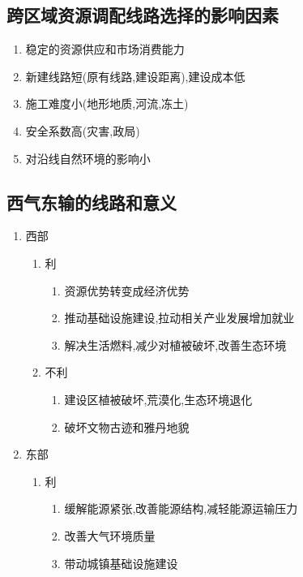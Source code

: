 \documentclass[a4paper]{article}
\begin{document}
    \subsection{跨区域资源调配线路选择的影响因素}
    \begin{enumerate}
        \item 稳定的资源供应和市场消费能力
        \item 新建线路短(原有线路,建设距离),建设成本低 %
        \item 施工难度小(地形地质,河流,冻土)
        \item 安全系数高(灾害,政局)
        \item 对沿线自然环境的影响小
    \end{enumerate}
    \subsection{西气东输的线路和意义}
    \begin{enumerate}
        \item 西部
        \begin{enumerate}
            \item 利
            \begin{enumerate}
                \item 资源优势转变成经济优势
                \item 推动基础设施建设,拉动相关产业发展增加就业
                \item 解决生活燃料,减少对植被破坏,改善生态环境
            \end{enumerate}
            \item 不利
            \begin{enumerate}
                \item 建设区植被破坏,荒漠化,生态环境退化
                \item 破坏文物古迹和雅丹地貌
            \end{enumerate}
        \end{enumerate}
        \item 东部
        \begin{enumerate}
            \item 利
            \begin{enumerate}
                \item 缓解能源紧张,改善能源结构,减轻能源运输压力
                \item 改善大气环境质量
                \item 带动城镇基础设施建设
            \end{enumerate}
        \end{enumerate}
    \end{enumerate}
\end{document}
